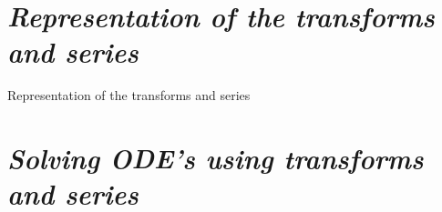 \documentclass[12pt, a4paper]{report}
\begin{document}
        
        
        
        
        
        
        
        
        
        
        

\chapter{\textit{Representation of the transforms and series}}

	{Representation of the transforms and series}

\chapter{\textit{Solving ODE's using transforms and series}}
\end{document}
